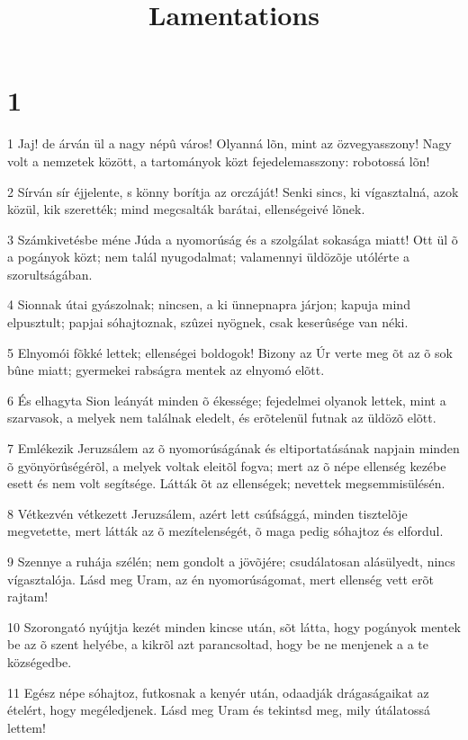 

\title{Lamentations}


\chapter{1}

\par 1 Jaj! de árván ül a nagy népû város! Olyanná lõn, mint az özvegyasszony! Nagy volt a nemzetek között, a tartományok közt fejedelemasszony: robotossá lõn!
\par 2 Sírván sír éjjelente, s könny borítja az orczáját! Senki sincs, ki vígasztalná, azok közül, kik szerették; mind megcsalták barátai, ellenségeivé lõnek.
\par 3 Számkivetésbe méne Júda a nyomorúság és a szolgálat sokasága miatt! Ott ül õ a pogányok közt; nem talál nyugodalmat; valamennyi üldözõje utólérte a szorultságában.
\par 4 Sionnak útai gyászolnak; nincsen, a ki ünnepnapra járjon; kapuja mind elpusztult; papjai sóhajtoznak, szûzei nyögnek, csak keserûsége van néki.
\par 5 Elnyomói fõkké lettek; ellenségei boldogok! Bizony az Úr verte meg õt az õ sok bûne miatt; gyermekei rabságra mentek az elnyomó elõtt.
\par 6 És elhagyta Sion leányát minden õ ékessége; fejedelmei olyanok lettek, mint a szarvasok, a melyek nem találnak eledelt, és erõtelenül futnak az üldözõ elõtt.
\par 7 Emlékezik Jeruzsálem az õ nyomorúságának és eltiportatásának napjain minden õ gyönyörûségérõl, a melyek voltak eleitõl fogva; mert az õ népe ellenség kezébe esett és nem volt segítsége. Látták õt az ellenségek; nevettek megsemmisülésén.
\par 8 Vétkezvén vétkezett Jeruzsálem, azért lett csúfsággá, minden tisztelõje megvetette, mert látták az õ mezítelenségét, õ maga pedig sóhajtoz és elfordul.
\par 9 Szennye a ruhája szélén; nem gondolt a jövõjére; csudálatosan alásülyedt, nincs vígasztalója. Lásd meg Uram, az én nyomorúságomat, mert ellenség vett erõt rajtam!
\par 10 Szorongató nyújtja kezét minden kincse után, sõt látta, hogy pogányok mentek be az õ szent helyébe, a kikrõl azt parancsoltad, hogy be ne menjenek a a te községedbe.
\par 11 Egész népe sóhajtoz, futkosnak a kenyér után, odaadják drágaságaikat az ételért, hogy megéledjenek. Lásd meg Uram és tekintsd meg, mily útálatossá lettem!
